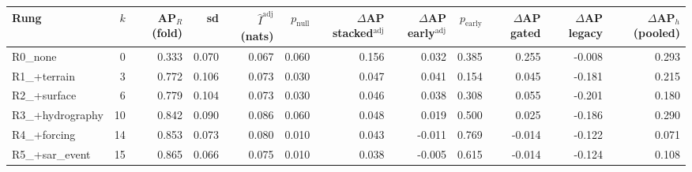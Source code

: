 \begin{tabular}{lrrrrrrrrrrr}
\toprule
Rung & $k$ & AP$_R$ (fold) & sd & $\hat I^{\mathrm{adj}}$ (nats) & $p_{\mathrm{null}}$ & $\Delta$AP stacked$^{\mathrm{adj}}$ & $\Delta$AP early$^{\mathrm{adj}}$ & $p_{\mathrm{early}}$ & $\Delta$AP gated & $\Delta$AP legacy & $\Delta$AP$_h$ (pooled) \\
\midrule
R0\_none & 0 & 0.333 & 0.070 & 0.067 & 0.060 & 0.156 & 0.032 & 0.385 & 0.255 & -0.008 & 0.293 \\
R1\_+terrain & 3 & 0.772 & 0.106 & 0.073 & 0.030 & 0.047 & 0.041 & 0.154 & 0.045 & -0.181 & 0.215 \\
R2\_+surface & 6 & 0.779 & 0.104 & 0.073 & 0.030 & 0.046 & 0.038 & 0.308 & 0.055 & -0.201 & 0.180 \\
R3\_+hydrography & 10 & 0.842 & 0.090 & 0.086 & 0.060 & 0.048 & 0.019 & 0.500 & 0.025 & -0.186 & 0.290 \\
R4\_+forcing & 14 & 0.853 & 0.073 & 0.080 & 0.010 & 0.043 & -0.011 & 0.769 & -0.014 & -0.122 & 0.071 \\
R5\_+sar\_event & 15 & 0.865 & 0.066 & 0.075 & 0.010 & 0.038 & -0.005 & 0.615 & -0.014 & -0.124 & 0.108 \\
\bottomrule
\end{tabular}
